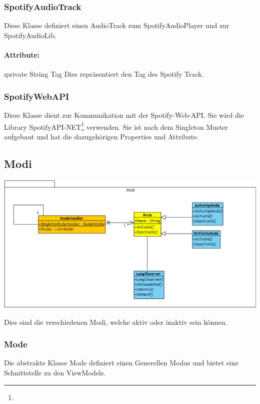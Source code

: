 \documentclass[../entwurf.tex]{subfiles}
\begin{document}
			\subsubsection{SpotifyAudioTrack}
				Diese Klasse definiert einen AudioTrack zum SpotifyAudioPlayer und zur SpotifyAudioLib.
				\paragraph{Attribute:}
					\begin{itemize}
						\i{private String Tag} Dies repräsentiert den Tag des Spotify Track.
					\end{itemize}
			\subsubsection{SpotifyWebAPI}
				Diese Klasse dient zur Kommunikation mit der Spotify-Web-API. Sie wird die Library 
				SpotifyAPI-NET\footnote{} verwenden.
				Sie ist nach dem Singleton Muster aufgebaut und hat die dazugehörigen Properties und Attribute.
		\subsection{Modi}
			\begin{minipage}{0.6\textwidth}
				\includegraphics[width=\textwidth,height=\textheight,keepaspectratio]{../graphics/uml_diagramme/Modi.png}
			\end{minipage}
			\begin{minipage}{0.4\textwidth}
				Dies sind die verschiedenen Modi, welche aktiv oder inaktiv sein können.
			\end{minipage}
			\subsubsection{Mode}
				Die abstrakte Klasse Mode definiert einen Generellen Modus und bietet eine Schnittstelle zu den ViewModels.
\end{document}
